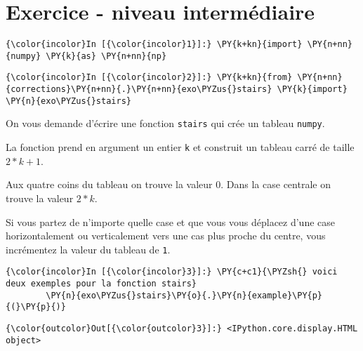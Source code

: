     
    
    
    

    

    \hypertarget{exercice---niveau-intermuxe9diaire}{%
\section{Exercice - niveau
intermédiaire}\label{exercice---niveau-intermuxe9diaire}}

    \begin{Verbatim}[commandchars=\\\{\},frame=single,framerule=0.3mm,rulecolor=\color{cellframecolor}]
{\color{incolor}In [{\color{incolor}1}]:} \PY{k+kn}{import} \PY{n+nn}{numpy} \PY{k}{as} \PY{n+nn}{np}
\end{Verbatim}


    \begin{Verbatim}[commandchars=\\\{\},frame=single,framerule=0.3mm,rulecolor=\color{cellframecolor}]
{\color{incolor}In [{\color{incolor}2}]:} \PY{k+kn}{from} \PY{n+nn}{corrections}\PY{n+nn}{.}\PY{n+nn}{exo\PYZus{}stairs} \PY{k}{import} \PY{n}{exo\PYZus{}stairs}
\end{Verbatim}


    On vous demande d'écrire une fonction \texttt{stairs} qui crée un
tableau \texttt{numpy}.

La fonction prend en argument un entier \texttt{k} et construit un
tableau carré de taille \(2*k+1\).

Aux quatre coins du tableau on trouve la valeur \(0\). Dans la case
centrale on trouve la valeur \(2*k\).

Si vous partez de n'importe quelle case et que vous vous déplacez d'une
case horizontalement ou verticalement vers une cas plus proche du
centre, vous incrémentez la valeur du tableau de \texttt{1}.

    \begin{Verbatim}[commandchars=\\\{\},frame=single,framerule=0.3mm,rulecolor=\color{cellframecolor}]
{\color{incolor}In [{\color{incolor}3}]:} \PY{c+c1}{\PYZsh{} voici deux exemples pour la fonction stairs}
        \PY{n}{exo\PYZus{}stairs}\PY{o}{.}\PY{n}{example}\PY{p}{(}\PY{p}{)}
\end{Verbatim}


\begin{Verbatim}[commandchars=\\\{\},frame=single,framerule=0.3mm,rulecolor=\color{cellframecolor}]
{\color{outcolor}Out[{\color{outcolor}3}]:} <IPython.core.display.HTML object>
\end{Verbatim}
            
